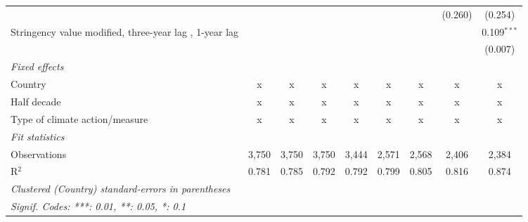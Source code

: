 \begin{table}[htbp]
\begin{tabular}{lcccccccc}
                                                                                                   &                &               &               &               &              &               & (0.260)       & (0.254)\\   
      Stringency value modified, three-year lag , 1-year lag                                       &                &               &               &               &              &               &               & 0.109$^{***}$\\   
                                                                                                   &                &               &               &               &              &               &               & (0.007)\\   
      \emph{Fixed effects}\\
      Country                                                                                      & x              & x             & x             & x             & x            & x             & x             & x\\  
      Half decade                                                                                  & x              & x             & x             & x             & x            & x             & x             & x\\  
      Type of climate action/measure                                                               & x              & x             & x             & x             & x            & x             & x             & x\\  
      \midrule \emph{Fit statistics}\\
      Observations                                                                                 & 3,750          & 3,750         & 3,750         & 3,444         & 2,571        & 2,568         & 2,406         & 2,384\\  
      R$^2$                                                                                        & 0.781          & 0.785         & 0.792         & 0.792         & 0.799        & 0.805         & 0.816         & 0.874\\  
      \midrule
      \multicolumn{9}{l}{\emph{Clustered (Country) standard-errors in parentheses}}\\
      \multicolumn{9}{l}{\emph{Signif. Codes: ***: 0.01, **: 0.05, *: 0.1}}\\
   \end{tabular}
\end{table}


